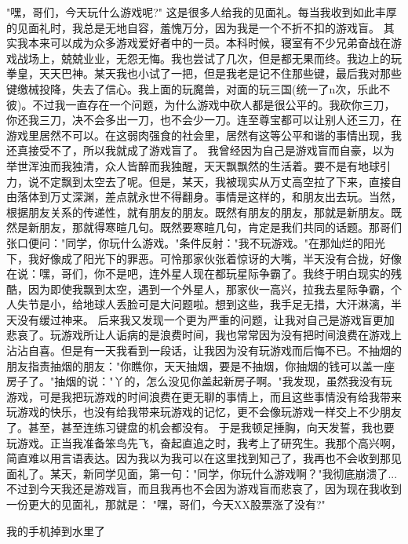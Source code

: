   "嘿，哥们，今天玩什么游戏呢?"
  这是很多人给我的见面礼。每当我收到如此丰厚的见面礼时，我总是无地自容，羞愧万分，因为我是一个不折不扣的游戏盲。
  其实我本来可以成为众多游戏爱好者中的一员。本科时候，寝室有不少兄弟奋战在游戏战场上，兢兢业业，无怨无悔。我也尝试了几次，但是都无果而终。我边上的玩拳皇，天天巴神。某天我也小试了一把，但是我老是记不住那些键，最后我对那些键缴械投降，失去了信心。我上面的玩魔兽，对面的玩三国(统一了n次，乐此不彼)。不过我一直存在一个问题，为什么游戏中砍人都是很公平的。我砍你三刀，你还我三刀，决不会多出一刀，也不会少一刀。连至尊宝都可以让别人还三刀，在游戏里居然不可以。在这弱肉强食的社会里，居然有这等公平和谐的事情出现，我还真接受不了，所以我就成了游戏盲了。
  我曾经因为自己是游戏盲而自豪，以为举世浑浊而我独清，众人皆醉而我独醒，天天飘飘然的生活着。要不是有地球引力，说不定飘到太空去了呢。但是，某天，我被现实从万丈高空拉了下来，直接自由落体到万丈深渊，差点就永世不得翻身。事情是这样的，和朋友出去玩。当然，根据朋友关系的传递性，就有朋友的朋友。既然有朋友的朋友，那就是新朋友。既然是新朋友，那就得寒暄几句。既然要寒暄几句，肯定是我们共同的话题。那哥们张口便问："同学，你玩什么游戏。"条件反射："我不玩游戏。"在那灿烂的阳光下，我好像成了阳光下的罪恶。可怜那家伙张着惊讶的大嘴，半天没有合拢，好像在说：嘿，哥们，你不是吧，连外星人现在都玩星际争霸了。我终于明白现实的残酷，因为即使我飘到太空，遇到一个外星人，那家伙一高兴，拉我去星际争霸，个人失节是小，给地球人丢脸可是大问题啦。想到这些，我手足无措，大汗淋漓，半天没有缓过神来。
  后来我又发现一个更为严重的问题，让我对自己是游戏盲更加悲哀了。玩游戏所让人诟病的是浪费时间，我也常常因为没有把时间浪费在游戏上沾沾自喜。但是有一天我看到一段话，让我因为没有玩游戏而后悔不已。不抽烟的朋友指责抽烟的朋友："你瞧你，天天抽烟，要是不抽烟，你抽烟的钱可以盖一座房子了。"抽烟的说："丫的，怎么没见你盖起新房子啊。"我发现，虽然我没有玩游戏，可是我把玩游戏的时间浪费在更无聊的事情上，而且这些事情没有给我带来玩游戏的快乐，也没有给我带来玩游戏的记忆，更不会像玩游戏一样交上不少朋友了。甚至，甚至连练习键盘的机会都没有。
  于是我顿足捶胸，向天发誓，我也要玩游戏。正当我准备笨鸟先飞，奋起直追之时，我考上了研究生。我那个高兴啊，简直难以用言语表达。因为我以为我可以在这里找到知己了，我再也不会收到那见面礼了。某天，新同学见面，第一句："同学，你玩什么游戏啊？"我彻底崩溃了...
  不过到今天我还是游戏盲，而且我再也不会因为游戏盲而悲哀了，因为现在我收到一份更大的见面礼，那就是：
  "嘿，哥们，今天XX股票涨了没有?"


我的手机掉到水里了


